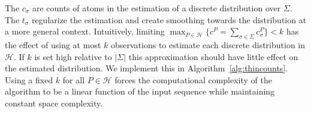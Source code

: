 The $c_{\sigma}$ are counts of atoms in the estimation of a discrete distribution over $\Sigma$.  The $t_{\sigma}$ regularize the estimation and create smoothing towards the distribution at a more general context.  Intuitively, limiting $\max_{P \in \mathcal{H}} \{ c^{P} =  \sum_{\sigma \in \Sigma} c^{P}_{\sigma} \} < k$  has the effect of using at most $k$ observations to estimate each discrete distribution in $\mathcal{H}$.  If $k$ is set high relative to $|\Sigma|$ this approximation should have little effect on the estimated distribution. We implement this in Algorithm~\ref{alg:thincounts}.  Using a fixed $k$ for all $P \in \mathcal{H}$ forces the computational complexity of the algorithm to be a linear function of the input sequence while maintaining constant space complexity.







